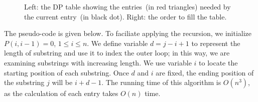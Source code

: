 \begin{figure}[h]
\centering{}
\caption{Left: the DP table showing the entries~(in red triangles) needed by the current entry~(in black dot).
Right: the order to fill the table.}
\label{fig:rna-table}
\end{figure}

The pseudo-code is given below. 
To faciliate applying the recursion, we initialize $P(i, i - 1) = 0$, $1 \le i \le n$.
We define variable $d = j - i + 1$ to represent the length of substring and use it to index the outer loop; in this way,
we are examining substrings with increasing length.
We use variable $i$ to locate the starting position of each substring.
Once $d$ and $i$ are fixed, the ending position of the substring $j$ will be $i + d - 1$.
The running time of this algorithm is $O(n^3)$, as the calculation
of each entry takes $O(n)$ time.

\begin{minipage}{0.8\textwidth}
	\xxx
	\xxx
	\xxx
	\xxx
	\xxx
	\xxx
	\xxx
	\xxx
	\xxx
	\xxx
	\xxx
	\xxx
	\xxx
	\xxx
	\xxx
\end{minipage}


